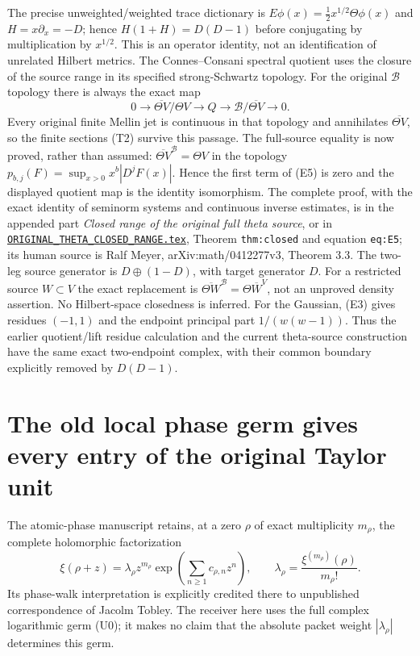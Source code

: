 \documentclass[11pt]{article}
\newcommand{\B}{\mathscr B}\newcommand{\M}{\mathcal M}
\begin{document}
The precise unweighted/weighted trace dictionary is
$E\phi(x)=\tfrac12 x^{1/2}\Theta\phi(x)$ and
$H=x\partial_x=-D$; hence $H(1+H)=D(D-1)$ before conjugating
by multiplication by $x^{1/2}$. This is an operator identity, not an
identification of unrelated Hilbert metrics. The Connes--Consani spectral
quotient uses the closure of the source range in its specified
strong-Schwartz topology. For the original $\B$ topology there is always
the exact map
\[
 0\to\overline{\Theta V}/\Theta V\to Q
       \to\B/\overline{\Theta V}\to0.\tag{E5}
\]
Every original finite Mellin jet is continuous in that topology and
annihilates $\overline{\Theta V}$, so the finite sections (T2) survive
this passage. The full-source equality is now proved, rather than assumed:
$\overline{\Theta V}^{\mathscr B}=\Theta V$ in the topology
$p_{b,j}(F)=\sup_{x>0}x^b|D^jF(x)|$. Hence the first term of (E5)
is zero and the displayed quotient map is the identity isomorphism.
The complete proof, with the exact identity of seminorm systems and
continuous inverse estimates, is in the appended part
\emph{Closed range of the original full theta source}, or in
\href{https://github.com/KokunoYumeto/zeta-function-research-reader/blob/5992ad50c0f2a06921f1fcaded7b4e38097c0739/workbenches/splitzero-tandem/continuations/20260920-original-kernel-mixed-determinants/providers/ORIGINAL_THETA_CLOSED_RANGE.tex\#L1}{\texttt{ORIGINAL\_THETA\_CLOSED\_RANGE.tex}}, Theorem
\texttt{thm:closed} and equation \texttt{eq:E5}; its human source is
Ralf Meyer, arXiv:math/0412277v3, Theorem 3.3. The two-leg source
generator is $D\oplus(1-D)$, with target generator $D$.
For a restricted source $W\subset V$ the exact replacement is
$\overline{\Theta W}^{\mathscr B}=\Theta\overline W^{V}$,
not an unproved density assertion. No Hilbert-space closedness is inferred.
For the Gaussian, (E3) gives residues $(-1,1)$ and the endpoint principal
part $1/(w(w-1))$. Thus the earlier quotient/lift residue calculation
and the current theta-source construction have the same exact two-endpoint
complex, with their common boundary explicitly removed by $D(D-1)$.

\section{The old local phase germ gives every entry of the original Taylor unit}
The atomic-phase manuscript retains, at a zero $\rho$ of exact multiplicity
$m_\rho$, the complete holomorphic factorization
\[
 \xi(\rho+z)=\lambda_\rho z^{m_\rho}
       \exp\!\left(\sum_{n\geq1}c_{\rho,n}z^n\right),\qquad
 \lambda_\rho=\frac{\xi^{(m_\rho)}(\rho)}{m_\rho!}.
 \tag{U0}
\]
Its phase-walk interpretation is explicitly credited there to unpublished
correspondence of Jacolm Tobley. The receiver here uses the full complex
logarithmic germ (U0); it makes no claim that the absolute packet weight
$|\lambda_\rho|$ determines this germ.
\end{document}
